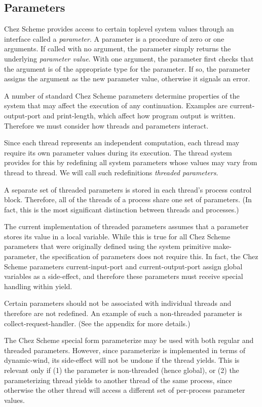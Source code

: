 \documentclass{article}
\begin{document}

\subsection{Parameters}

Chez Scheme provides access to certain toplevel system values through
an interface called a {\em parameter}.  A parameter is a procedure of
zero or one arguments.  If called with no argument, the parameter
simply returns the underlying {\em parameter value}.  With one
argument, the parameter first checks that the argument is of the
appropriate type for the parameter.  If so, the parameter assigns the
argument as the new parameter value, otherwise it signals an error.

A number of standard Chez Scheme parameters determine properties of
the system that may affect the execution of any continuation.
Examples are {\sf current-output-port} and {\sf print-length}, which
affect how program output is written.  Therefore we must consider how
threads and parameters interact.

Since each thread represents an independent computation, each thread
may require its own parameter values during its execution. The thread
system provides for this by redefining all system parameters whose
values may vary from thread to thread.  We will call such
redefinitions {\em threaded parameters}.

A separate set of threaded parameters is stored in each thread's
process control block.  Therefore, all of the threads of a process
share one set of parameters. (In fact, this is the most significant
distinction between threads and processes.)

The current implementation of threaded parameters assumes that a
parameter stores its value in a local variable.  While this is true
for all Chez Scheme parameters that were originally defined using the
system primitive {\sf make-parameter}, the specification of parameters
does not require this.  In fact, the Chez Scheme parameters {\sf
current-input-port} and {\sf current-output-port} assign global
variables as a side-effect, and therefore these parameters must
receive special handling within {\sf yield}.

Certain parameters should not be associated with individual threads
and therefore are not redefined.  An example of such a non-threaded
parameter is {\sf collect-request-handler}. (See the appendix for more
details.)

The Chez Scheme special form {\sf parameterize} may be used with both
regular and threaded parameters. However, since {\sf parameterize} is
implemented in terms of {\sf dynamic-wind}, its side-effect will not be
undone if the thread yields.  This is relevant only if (1) the
parameter is non-threaded (hence global), or (2) the parameterizing
thread yields to another thread of the same process, since otherwise
the other thread will access a different set of per-process parameter
values.
\end{document}
